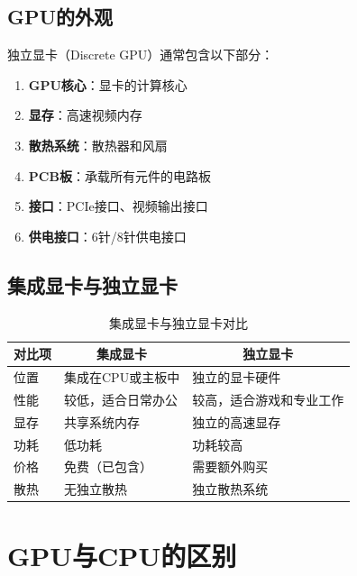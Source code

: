 \documentclass[12pt,UTF8]{ctexbook}
\begin{document}
\section{GPU的外观}

独立显卡（Discrete GPU）通常包含以下部分：

\begin{enumerate}
    \item \textbf{GPU核心}：显卡的计算核心
    \item \textbf{显存}：高速视频内存
    \item \textbf{散热系统}：散热器和风扇
    \item \textbf{PCB板}：承载所有元件的电路板
    \item \textbf{接口}：PCIe接口、视频输出接口
    \item \textbf{供电接口}：6针/8针供电接口
\end{enumerate}

\section{集成显卡与独立显卡}

\begin{table}[H]
    \centering
    \begin{tabularx}{\textwidth}{|p{4cm}|X|X|}
        \hline
        \multicolumn{1}{|c|}{\textbf{对比项}} & \multicolumn{1}{c|}{\textbf{集成显卡}} & \multicolumn{1}{c|}{\textbf{独立显卡}} \\
        \hline
        位置 & 集成在CPU或主板中 & 独立的显卡硬件 \\
        \hline
        性能 & 较低，适合日常办公 & 较高，适合游戏和专业工作 \\
        \hline
        显存 & 共享系统内存 & 独立的高速显存 \\
        \hline
        功耗 & 低功耗 & 功耗较高 \\
        \hline
        价格 & 免费（已包含） & 需要额外购买 \\
        \hline
        散热 & 无独立散热 & 独立散热系统 \\
        \hline
    \end{tabularx}
    \caption{集成显卡与独立显卡对比}
    \label{tab:integrated_vs_discrete}
\end{table}

\chapter{GPU与CPU的区别}
\end{document}
